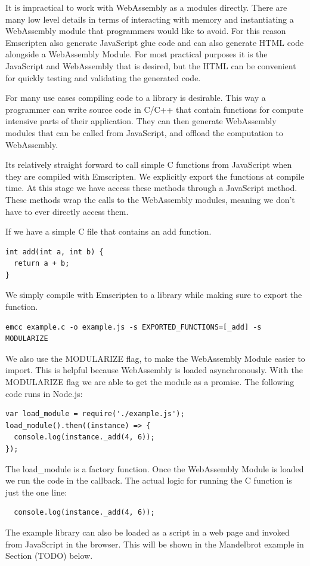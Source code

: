 \documentclass[11pt]{book}
\begin{document}
It is impractical to work with WebAssembly as a modules directly. There are many low level details in terms of interacting with memory and instantiating a WebAssembly module that programmers would like to avoid. For this reason Emscripten also generate JavaScript glue code and can also generate HTML code alongside a WebAssembly Module. For most practical purposes it is the JavaScript and WebAssembly that is desired, but the HTML can be convenient for quickly testing and validating the generated code. 

For many use cases compiling code to a library is desirable. This way a programmer can write source code in C/C++ that contain functions for compute intensive parts of their application. They can then generate WebAssembly modules that can be called from JavaScript, and offload the computation to WebAssembly. 

Its relatively straight forward to call simple C functions from JavaScript when they are compiled with Emscripten. We explicitly export the functions at compile time. At this stage we have access these methods through a JavaScript method. These methods wrap the calls to the WebAssembly modules, meaning we don't have to ever directly access them.

If we have a simple C file that contains an add function.
\begin{verbatim}
int add(int a, int b) {
  return a + b;
}
\end{verbatim}
We simply compile with Emscripten to a library while making sure to export the function.
\begin{verbatim}
emcc example.c -o example.js -s EXPORTED_FUNCTIONS=[_add] -s MODULARIZE
\end{verbatim}
We also use the MODULARIZE flag, to make the WebAssembly Module easier to import. This is helpful because WebAssembly is loaded asynchronously. With the MODULARIZE flag we are able to get the module as a promise. The following code runs in Node.js:
\begin{verbatim}
var load_module = require('./example.js');
load_module().then((instance) => {
  console.log(instance._add(4, 6));
});
\end{verbatim}
The load\_module is a factory function. Once the WebAssembly Module is loaded we run the code in the callback. The actual logic for running the C function is just the one line:
\begin{verbatim}
  console.log(instance._add(4, 6));
\end{verbatim}
The example library can also be loaded as a script in a web page and invoked from JavaScript in the browser. This will be shown in the Mandelbrot example in Section (TODO) below.
\end{document}
